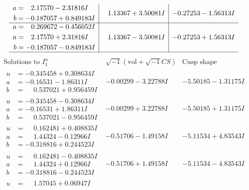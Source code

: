 \documentclass[1p]{elsarticle_modified}
\theoremstyle{definition}
\newcommand{\I}{\sqrt{-1}}
\begin{document}
$$\begin{array}{c|c|c}
\begin{aligned}
a &= \phantom{-}2.17570 - 2.31816 I \\
b &= -0.187057 + 0.849183 I\end{aligned}
 & \phantom{-}1.13367 + 3.50081 I & -0.27253 - 1.56313 I \\ \hline\begin{aligned}
u &= \phantom{-}0.269672 - 0.456052 I \\
a &= \phantom{-}2.17570 + 2.31816 I \\
b &= -0.187057 - 0.849183 I\end{aligned}
 & \phantom{-}1.13367 - 3.50081 I & -0.27253 + 1.56313 I\\
 \hline 
 \end{array}$$\newpage$$\begin{array}{c|c|c}  
\text{Solutions to }I^u_{1}& \I (\text{vol} + \sqrt{-1}CS) & \text{Cusp shape}\\
 \hline 
\begin{aligned}
u &= -0.345458 + 0.308634 I \\
a &= -0.16531 - 1.86311 I \\
b &= \phantom{-}0.537021 + 0.956459 I\end{aligned}
 & -0.00299 - 3.22788 I & -5.50185 - 1.31175 I \\ \hline\begin{aligned}
u &= -0.345458 - 0.308634 I \\
a &= -0.16531 + 1.86311 I \\
b &= \phantom{-}0.537021 - 0.956459 I\end{aligned}
 & -0.00299 + 3.22788 I & -5.50185 + 1.31175 I \\ \hline\begin{aligned}
u &= \phantom{-}0.162481 + 0.408835 I \\
a &= \phantom{-}1.44324 - 0.12966 I \\
b &= -0.318816 + 0.244523 I\end{aligned}
 & -0.51706 - 1.49158 I & -5.11534 + 4.83543 I \\ \hline\begin{aligned}
u &= \phantom{-}0.162481 - 0.408835 I \\
a &= \phantom{-}1.44324 + 0.12966 I \\
b &= -0.318816 - 0.244523 I\end{aligned}
 & -0.51706 + 1.49158 I & -5.11534 - 4.83543 I \\ \hline\begin{aligned}
u &= \phantom{-}1.57045 + 0.06947 I \\

\end{aligned}
\end{array}$$
\end{document}
